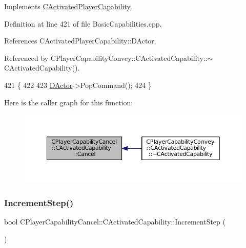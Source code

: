 Implements \hyperlink{classCActivatedPlayerCapability_a5cde83be468e262ad054d81e28684a81}{C\+Activated\+Player\+Capability}.



Definition at line 421 of file Basic\+Capabilities.\+cpp.



References C\+Activated\+Player\+Capability\+::\+D\+Actor.



Referenced by C\+Player\+Capability\+Convey\+::\+C\+Activated\+Capability\+::$\sim$\+C\+Activated\+Capability().


\begin{DoxyCode}
421                                                         \{
422 
423     \hyperlink{classCActivatedPlayerCapability_a54ca944b47bff2718330639941d402b0}{DActor}->PopCommand();
424 \}
\end{DoxyCode}
Here is the caller graph for this function\+:\nopagebreak
\begin{figure}[H]
\begin{center}
\leavevmode
\includegraphics[width=350pt]{classCPlayerCapabilityCancel_1_1CActivatedCapability_accd67b449574b6c99e21f522d13bc96a_icgraph}
\end{center}
\end{figure}
\hypertarget{classCPlayerCapabilityCancel_1_1CActivatedCapability_a28351293b3a662bca20a2d666b8801e1}{}\label{classCPlayerCapabilityCancel_1_1CActivatedCapability_a28351293b3a662bca20a2d666b8801e1} 
\subsubsection{\texorpdfstring{Increment\+Step()}{IncrementStep()}}
{\footnotesize\ttfamily bool C\+Player\+Capability\+Cancel\+::\+C\+Activated\+Capability\+::\+Increment\+Step (\begin{DoxyParamCaption}{ }\end{DoxyParamCaption})\hspace{0.3cm}{\ttfamily [virtual]}}



